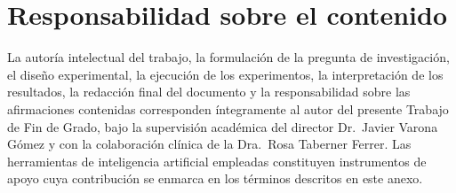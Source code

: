 \section{Responsabilidad sobre el contenido}
\label{sec:anexod-responsabilidad}

La autoría intelectual del trabajo, la formulación de la pregunta
de investigación, el diseño experimental, la ejecución de los
experimentos, la interpretación de los resultados, la redacción
final del documento y la responsabilidad sobre las afirmaciones
contenidas corresponden íntegramente al autor del presente
Trabajo de Fin de Grado, bajo la supervisión académica del
director Dr.~Javier Varona Gómez y con la colaboración clínica de
la Dra.~Rosa Taberner Ferrer. Las herramientas de inteligencia
artificial empleadas constituyen instrumentos de apoyo cuya
contribución se enmarca en los términos descritos en este anexo.
